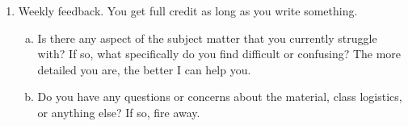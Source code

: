\documentclass{article}\usepackage{graphicx, color}
\numberwithin{equation}{section}
\begin{document}
\begin{flushleft}
\begin{enumerate}[1. ]
\item Weekly feedback. You get full credit as long as you write something.
\begin{enumerate}[a. ]
\item Is there any aspect of the subject matter that you currently struggle with? If so, what specifically do you find difficult or confusing? The more detailed you are, the better I can help you.


\item Do you have any questions or concerns about the material, class logistics, or anything else? If so, fire away.

\end{enumerate}
\end{enumerate}
\end{flushleft}
\end{document}
